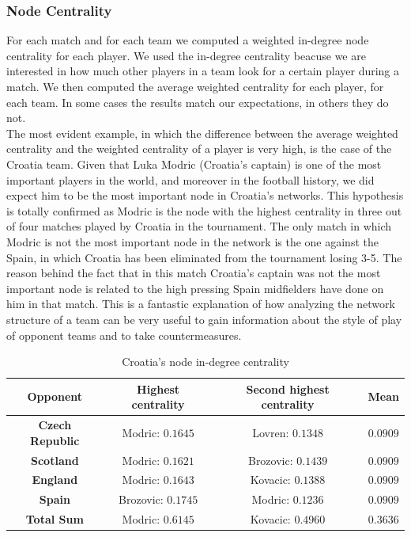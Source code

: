 \documentclass[12pt, a4paper]{article}
\begin{document}
\subsubsection{Node Centrality}
For each match and for each team we computed a weighted in-degree node centrality for each player. We used the in-degree centrality beacuse we are interested in how much other players in a team look for a certain player during a match. We then computed the average weighted centrality for each player, for each team. In some cases the results match our expectations, in others they do not. \\
The most evident example, in which the difference between the average weighted centrality and the weighted centrality of a player is very high, is the case of the Croatia team. Given that Luka Modric (Croatia's captain) is one of the most important players in the world, and moreover in the football history, we did expect him to be the most important node in Croatia's networks. This hypothesis is totally confirmed as Modric is the node with the highest centrality in three out of four matches played by Croatia in the tournament. The only match in which Modric is not the most important node in the network is the one against the Spain, in which Croatia has been eliminated from the tournament losing 3-5. The reason behind the fact that in this match Croatia's captain was not the most important node is related to the high pressing Spain midfielders have done on him in that match. This is a fantastic explanation of how analyzing the network structure of a team can be very useful to gain information about the style of play of opponent teams and to take countermeasures. \\ 

\begin{table}[H]
    \centering
    \begin{tabular}{|c|c|c|c|}
            \hline
            \textbf{Opponent} &  \textbf{Highest centrality} &  \textbf{Second highest centrality} &  \textbf{Mean} \\
            \hline
            \textbf{Czech Republic} &  Modric: $0.1645$ & Lovren: $0.1348$ & $0.0909$ \\
            \hline
            \textbf{ Scotland} &  Modric: $0.1621$ & Brozovic: $0.1439$ & $0.0909$ \\
            \hline
            \textbf{England} &  Modric: $0.1643$ & Kovacic: $0.1388$ & $0.0909$ \\
            \hline
            \textbf{Spain} &  Brozovic: $0.1745$ & Modric: $0.1236$ & $0.0909$ \\
            \hline
            \textbf{Total Sum} &  Modric: $0.6145$ & Kovacic: $0.4960$ & $0.3636$ \\
            \hline
    \end{tabular}
    \caption{Croatia's node in-degree centrality}
\end{table}
\end{document}
